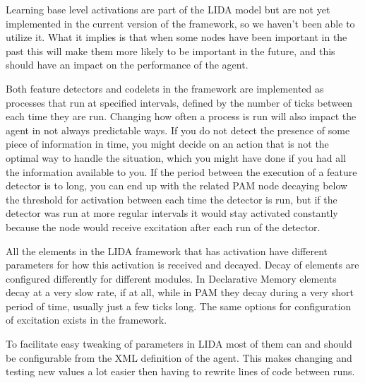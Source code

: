 Learning base level activations are part of the LIDA model but are not yet implemented in the current version of the framework, so we haven't been able to utilize it. What it implies is that when some nodes have been important in the past this will make them more likely to be important in the future, and this should have an impact on the performance of the agent. 

Both feature detectors and codelets in the framework are implemented as processes that run at specified intervals, defined by the number of ticks between each time they are run. Changing how often a process is run will also impact the agent in not always predictable ways. If you do not detect the presence of some piece of information in time, you might decide on an action that is not the optimal way to handle the situation, which you might have done if you had all the information available to you. If the period between the execution of a feature detector is to long, you can end up with the related PAM node decaying below the threshold for activation between each time the detector is run, but if the detector was run at more regular intervals it would stay activated constantly because the node would receive excitation after each run of the detector. 

All the elements in the LIDA framework that has activation have different parameters for how this activation is received and decayed. Decay of elements are configured differently for different modules. In Declarative Memory elements decay at a very slow rate, if at all, while in PAM they decay during a very short period of time, usually just a few ticks long. The same options for configuration of excitation exists in the framework.

To facilitate easy tweaking of parameters in LIDA most of them can and should be configurable from the XML definition of the agent. This makes changing and testing new values a lot easier then having to rewrite lines of code between runs.
